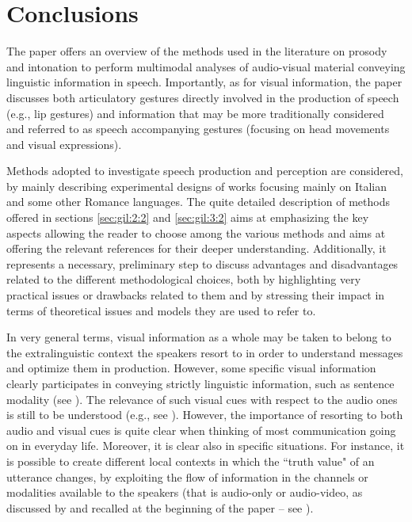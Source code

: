 \documentclass[output=paper]{langsci/langscibook}
\begin{document}
\section{Conclusions}\label{sec:gil:4}\largerpage
The paper offers an overview of the methods used in the literature on prosody and intonation to perform multimodal analyses of audio-visual material conveying linguistic information in speech. Importantly, as for visual information, the paper discusses both articulatory gestures directly involved in the production of speech (e.g., lip gestures) and information that may be more traditionally considered and referred to as speech accompanying gestures (focusing on head movements and visual expressions). 

Methods adopted to investigate speech production and perception are considered, by mainly describing experimental designs of works focusing mainly on Italian and some other Romance languages. The quite detailed description of methods offered in sections \ref{sec:gil:2:2} and \ref{sec:gil:3:2} aims at emphasizing the key aspects allowing the reader to choose among the various methods and aims at offering the relevant references for their deeper understanding.  Additionally, it represents a necessary, preliminary step to discuss advantages and disadvantages related to the different methodological choices, both by highlighting very practical issues or drawbacks related to them and by stressing their impact in terms of theoretical issues and models they are used to refer to.

In very general terms, visual information as a whole may be taken to belong to the extralinguistic context the speakers resort to in order to understand messages and optimize them in production. However, some specific visual information clearly participates in conveying strictly linguistic information, such as sentence modality (see ). The relevance of such visual cues with respect to the audio ones is still to be understood (e.g., see ). However, the importance of resorting to both audio and visual cues is quite clear when thinking of most communication going on in everyday life. Moreover, it is clear also in specific situations. For instance, it is possible to create different local contexts in which the ``truth value" of an utterance changes, by exploiting the flow of information in the channels or modalities available to the speakers (that is audio-only or audio-video, as discussed by \citealt{GiliFivela2014} and recalled at the beginning of the paper -- see ). 
\end{document}
